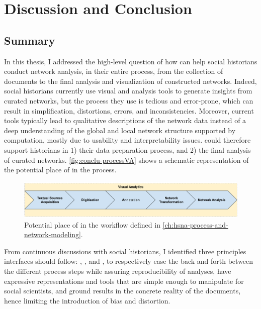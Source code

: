 \chapter{Discussion and Conclusion}\label{ch:conclusion}
\minitoc

\section{Summary}

In this thesis, I addressed the high-level question of how \va can help social historians conduct network analysis, in their entire process, from the collection of documents to the final analysis and visualization of constructed networks.
Indeed, social historians currently use visual and analysis tools to generate insights from curated networks, but the process they use is tedious and error-prone, which can result in simplification, distortions, errors, and inconsistencies\cite{alkadi2022, lemercier12FormalNetwork2015}.
Moreover, current tools typically lead to qualitative descriptions of the network data\cite{rollingerProlegomenaProblemsPerspectives2020} instead of a deep understanding of the global and local network structure supported by computation, mostly due to usability and interpretability issues.
\va could therefore support historians in 1) their data preparation process, and 2) the final analysis of curated networks.
\autoref{fig:conclu-processVA} shows a schematic representation of the potential place of \va in the \hsna process.
\begin{figure}[!ht]
    \centering
    \includegraphics[width=\textwidth]{static/figures/conclusion/workflowVA}
    \caption{Potential place of \va in the \hsna workflow defined in \autoref{ch:hsna-process-and-network-modeling}.}
\label{fig:conclu-processVA}
\end{figure}
From continuous discussions with social historians, I identified three principles \va interfaces should follow: \traceability, \simplicity, and \reality, to respectively ease the back and forth between the different process steps while assuring reproducibility of analyses, have expressive representations and tools that are simple enough to manipulate for social scientists, and ground results in the concrete reality of the documents, hence limiting the introduction of bias and distortion.
